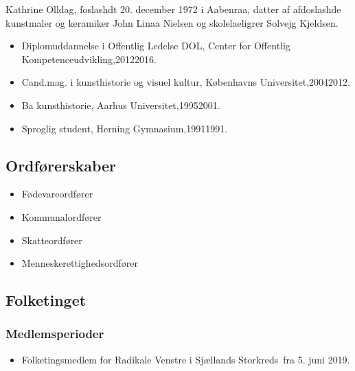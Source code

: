 \documentclass[11pt, a4paper]{awesome-cv}
\begin{document}
\makecvheader[R]
\makelettertitle
\begin{cvletter}
Kathrine Olldag, foslashdt 20. december 1972 i Aabenraa, datter af afdoslashde kunstmaler og keramiker John Linaa Nielsen og skolelaeligrer Solvejg Kjeldsen.

\begin{itemize}
\item Diplomuddannelse i Offentlig Ledelse DOL, Center for Offentlig Kompetenceudvikling,20122016.
\item Cand.mag. i kunsthistorie og visuel kultur, Københavns Universitet,20042012.
\item Ba kunsthistorie, Aarhus Universitet,19952001.
\item Sproglig student, Herning Gymnasium,19911991.
\end{itemize}
\subsection*{Ordførerskaber}
\begin{itemize}
\item Fødevareordfører
\item Kommunalordfører
\item Skatteordfører
\item Menneskerettighedsordfører
\end{itemize}
\subsection*{Folketinget}
\subsubsection*{Medlemsperioder}
\begin{itemize}
\item Folketingsmedlem for Radikale Venstre i Sjællands Storkreds fra 5. juni 2019.
\end{itemize}

\end{cvletter}
\end{document}
